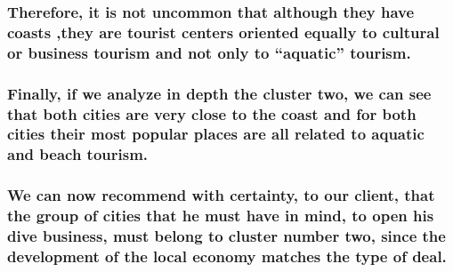 \documentclass[11pt]{article}
\begin{document}
\hypertarget{therefore-it-is-not-uncommon-that-although-they-have-coasts-they-are-tourist-centers-oriented-equally-to-cultural-or-business-tourism-and-not-only-to-aquatic-tourism.}{%
\subsubsection{Therefore, it is not uncommon that although they have
coasts ,they are tourist centers oriented equally to cultural or
business tourism and not only to ``aquatic''
tourism.}\label{therefore-it-is-not-uncommon-that-although-they-have-coasts-they-are-tourist-centers-oriented-equally-to-cultural-or-business-tourism-and-not-only-to-aquatic-tourism.}}

\hypertarget{finally-if-we-analyze-in-depth-the-cluster-two-we-can-see-that-both-cities-are-very-close-to-the-coast-and-for-both-cities-their-most-popular-places-are-all-related-to-aquatic-and-beach-tourism.}{%
\subsubsection{Finally, if we analyze in depth the cluster two, we can
see that both cities are very close to the coast and for both cities
their most popular places are all related to aquatic and beach
tourism.}\label{finally-if-we-analyze-in-depth-the-cluster-two-we-can-see-that-both-cities-are-very-close-to-the-coast-and-for-both-cities-their-most-popular-places-are-all-related-to-aquatic-and-beach-tourism.}}

    \hypertarget{we-can-now-recommend-with-certainty-to-our-client-that-the-group-of-cities-that-he-must-have-in-mind-to-open-his-dive-business-must-belong-to-cluster-number-two-since-the-development-of-the-local-economy-matches-the-type-of-deal.}{%
\subsubsection{We can now recommend with certainty, to our client, that
the group of cities that he must have in mind, to open his dive
business, must belong to cluster number two, since the development of
the local economy matches the type of
deal.}\label{we-can-now-recommend-with-certainty-to-our-client-that-the-group-of-cities-that-he-must-have-in-mind-to-open-his-dive-business-must-belong-to-cluster-number-two-since-the-development-of-the-local-economy-matches-the-type-of-deal.}}


    
    
    
\end{document}
